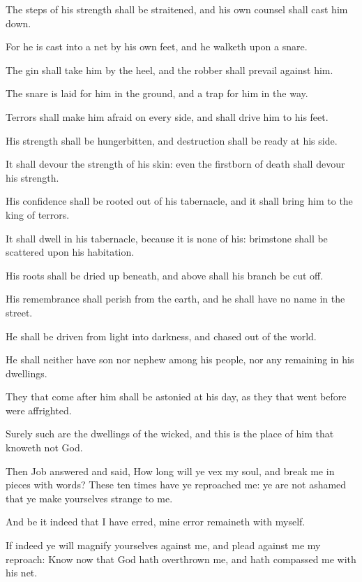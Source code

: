 \Verse The steps of his strength shall be straitened, and his own counsel shall cast him down.

\Verse For he is cast into a net by his own feet, and he walketh upon a snare.

\Verse The gin shall take him by the heel, and the robber shall prevail against him.

\Verse The snare is laid for him in the ground, and a trap for him in the way.

\Verse Terrors shall make him afraid on every side, and shall drive him to his feet.

\Verse His strength shall be hungerbitten, and destruction shall be ready at his side.

\Verse It shall devour the strength of his skin: even the firstborn of death shall devour his strength.

\Verse His confidence shall be rooted out of his tabernacle, and it shall bring him to the king of terrors.

\Verse It shall dwell in his tabernacle, because it is none of his: brimstone shall be scattered upon his habitation.

\Verse His roots shall be dried up beneath, and above shall his branch be cut off.

\Verse His remembrance shall perish from the earth, and he shall have no name in the street.

\Verse He shall be driven from light into darkness, and chased out of the world.

\Verse He shall neither have son nor nephew among his people, nor any remaining in his dwellings.

\Verse They that come after him shall be astonied at his day, as they that went before were affrighted.

\Verse Surely such are the dwellings of the wicked, and this is the place of him that knoweth not God.


\Chapter
\Verse Then Job answered and said, \Verse How long will ye vex my soul, and break me in pieces with words?  \Verse These ten times have ye reproached me: ye are not ashamed that ye make yourselves strange to me.

\Verse And be it indeed that I have erred, mine error remaineth with myself.

\Verse If indeed ye will magnify yourselves against me, and plead against me my reproach: \Verse Know now that God hath overthrown me, and hath compassed me with his net.

